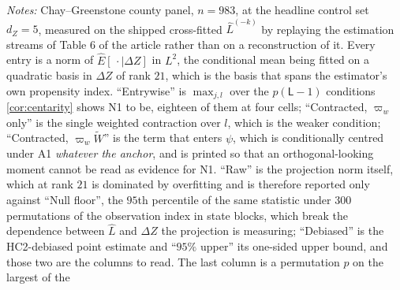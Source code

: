 \documentclass[
  12pt]{article}
\newcommand{\1}[1]{\mathds{1}\left[#1\right]}
\theoremstyle{plain}
\theoremstyle{definition}
\theoremstyle{definition}
\theoremstyle{remark}
\begin{document}
\begin{table}[!htbp]
\centering
\begin{threeparttable}
\caption{Is N1 imposed? The defect over the class of constant anchors}
\label{tab:app-n1}
\footnotesize

\begin{tablenotes}\footnotesize
\item \textit{Notes:} Chay--Greenstone county panel, $n=983$, at the headline
control set $d_Z=5$, measured on the shipped cross-fitted $\hat L^{(-k)}$ by
replaying the estimation streams of Table 6 of the article rather than on a
reconstruction of it. Every entry is a norm of
$\widehat E[\,\cdot\mid\Delta Z]$ in $L^{2}$, the conditional mean being fitted on
a quadratic basis in $\Delta Z$ of rank $21$, which is the basis that spans the
estimator's own propensity index. ``Entrywise'' is $\max_{j,l}$ over the
$p(\mathsf L-1)$ conditions \cref{cor:centarity} shows N1 to be, eighteen of them
at four cells;
``Contracted, $\varpi_w$ only'' is the single weighted contraction over $l$,
which is the weaker condition; ``Contracted, $\varpi_w\widetilde W$'' is the term
that enters $\psi$, which is conditionally centred under A1 \emph{whatever the
anchor}, and is printed so that an orthogonal-looking moment cannot be read as
evidence for N1. ``Raw'' is the projection norm itself, which at rank $21$ is
dominated by overfitting and is therefore reported only against ``Null floor'',
the $95$th percentile of the same statistic under $300$ permutations of the
observation index in state blocks, which break the dependence between $\hat L$
and $\Delta Z$ the projection is measuring; ``Debiased'' is the HC2-debiased
point estimate and ``$95\%$ upper'' its one-sided upper bound, and those two are
the columns to read. The last column is a permutation $p$ on the largest of the

\end{tablenotes}
\end{threeparttable}
\end{table}
\end{document}
